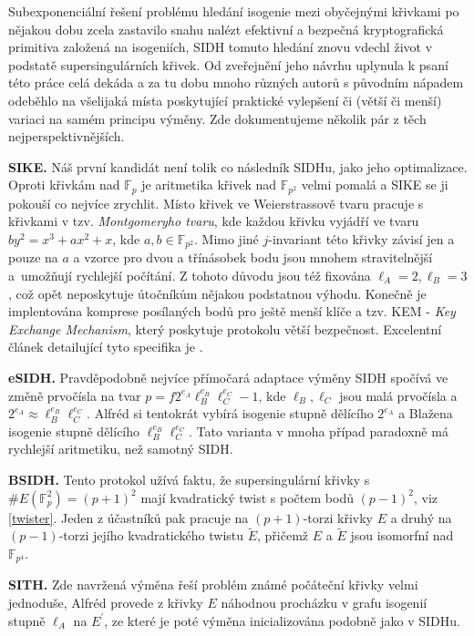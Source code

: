 \documentclass[12pt]{report}
\begin{document}
Subexponenciální řešení problému hledání isogenie mezi obyčejnými křivkami po nějakou dobu zcela zastavilo snahu nalézt efektivní a bezpečná kryptografická primitiva založená na isogeniích, SIDH tomuto hledání znovu vdechl život v podstatě supersingulárních křivek. Od zveřejnění jeho návrhu uplynula k psaní této práce celá dekáda a za tu dobu mnoho různých autorů s původním nápadem odeběhlo na všelijaká místa poskytující praktické vylepšení či (větší či menší) variaci na samém principu výměny. Zde dokumentujeme několik pár z těch nejperspektivnějších.

\textbf{SIKE.} \cite{SIKE} Náš první kandidát není tolik co následník SIDHu, jako jeho optimalizace. Oproti křivkám nad $\mathbb{F}_p$ je aritmetika křivek nad $\mathbb{F}_{p^2}$ velmi pomalá a SIKE se ji pokouší co nejvíce zrychlit. Místo křivek ve Weierstrassově tvaru pracuje s křivkami v tzv. \textit{Montgomeryho tvaru}, kde každou křivku vyjádří ve tvaru $b y^2 = x^3 + ax^2 + x$, kde $a,b \in \mathbb{F}_{p^2}$. Mimo jiné $j$-invariant této křivky závisí jen a pouze na $a$ a vzorce pro dvou a třínásobek bodu jsou mnohem stravitelnější a~umožňují rychlejší počítání. Z tohoto důvodu jsou též fixována $\ell_A = 2, \ell_B = 3$, což opět neposkytuje útočníkům nějakou podstatnou výhodu. Konečně je implentována komprese posílaných bodů pro ještě menší klíče a tzv. KEM - \textit{Key Exchange Mechanism}, který poskytuje protokolu větší bezpečnost. Excelentní článek detailující tyto specifika je \cite{Costello}. 

\textbf{eSIDH.} \cite{eSIDH} Pravděpodobně nejvíce přímočará adaptace výměny SIDH spočívá ve změně prvočísla na tvar $p = f 2^{e_A} \ell_B ^{e_B} \ell_C ^{e_C} - 1$, kde $\ell_B,\ell_C$ jsou malá prvočísla a $2^{e_A} \approx \ell_B ^{e_B} \ell_C ^{e_C}$. Alfréd si tentokrát vybírá isogenie stupně dělícího $2^{e_A}$ a Blažena isogenie stupně dělícího $\ell_B ^{e_B} \ell_C ^{e_C}$. Tato varianta v mnoha případ paradoxně má rychlejší aritmetiku, než samotný SIDH.

\textbf{BSIDH.} \cite{BSIDH} Tento protokol užívá faktu, že supersingulární křivky s $\#E(\mathbb{F}_p^2) = (p+1)^2$ mají kvadratický twist s počtem bodů $(p-1)^2$, viz \ref{twister}. Jeden z účastníků pak pracuje na $(p+1)$-torzi křivky $E$ a druhý na $(p-1)$-torzi jejího kvadratického twistu $\tilde{E}$, přičemž $E$ a $\tilde{E}$ jsou isomorfní nad $\mathbb{F}_{p^4}$.

\textbf{SITH.} \cite{Dark} Zde navržená výměna řeší problém známé počáteční křivky velmi jednoduše, Alfréd provede z křivky $E$ náhodnou procházku v grafu isogenií stupně $\ell_A$ na $E^\prime$, ze které je poté výměna inicializována podobně jako v SIDHu.
\end{document}
